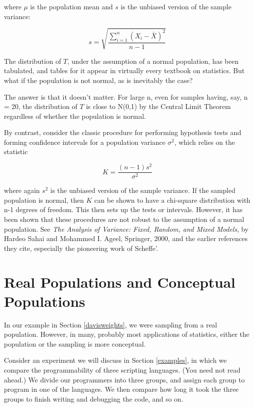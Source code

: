 where $\mu$ is the population mean and $s$ is the unbiased version of
the sample variance:

\begin{equation}
s = \sqrt{\frac{\sum_{i=1}^n (X_i-\bar{X})^2}{n-1}}
\end{equation}

The distribution of $T$, under the assumption of a normal population,
has been tabulated, and tables for it appear in virtually every textbook
on statistics.  But what if the population is not normal, as is
inevitably the case?

The answer is that it doesn't matter.  For large n, even for samples
having, say, n = 20, the distribution of $T$ is close to N(0,1) by the
Central Limit Theorem regardless of whether the population is normal.

By contrast, consider the classic procedure for performing hypothesis
tests and forming confidence intervals for a population variance
$\sigma^2$, which relies on the statistic

\begin{equation}
K = \frac{(n-1)s^2}{\sigma^2}
\end{equation}

where again $s^2$ is the unbiased version of the sample variance.
If the sampled population is normal, then $K$ can be shown to have a
chi-square distribution with n-1 degrees of freedom.  This then sets up
the tests or intervals.  However, it has been shown that these
procedures are not robust to the assumption of a normal population.
See {\it The Analysis of Variance: Fixed, Random, and Mixed Models},
by Hardeo Sahai and Mohammed I. Ageel, Springer, 2000, and the earlier
references they cite, especially the pioneering work of Scheffe'.

\section{Real Populations and Conceptual Populations}

In our example in Section \ref{davisweights}, we were sampling from a
real population.  However, in many, probably most applications of
statistics, either the population or the sampling is more conceptual.

Consider an experiment we will discuss in Section \ref{examples},  in
which we compare the programmability of three scripting languages.  (You
need not read ahead.)  We divide our programmers into three groups, and
assign each group to program in one of the languages.  We then compare
how long it took the three groups to finish writing and debugging the
code, and so on.

